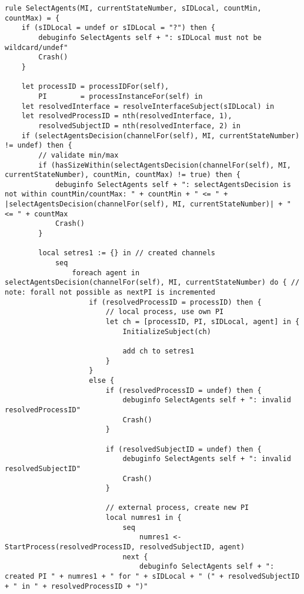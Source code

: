 \begin{listing}[H]
\begin{verbatim}
rule SelectAgents(MI, currentStateNumber, sIDLocal, countMin, countMax) = {
    if (sIDLocal = undef or sIDLocal = "?") then {
        debuginfo SelectAgents self + ": sIDLocal must not be wildcard/undef"
        Crash()
    }

    let processID = processIDFor(self),
        PI        = processInstanceFor(self) in
    let resolvedInterface = resolveInterfaceSubject(sIDLocal) in
    let resolvedProcessID = nth(resolvedInterface, 1),
        resolvedSubjectID = nth(resolvedInterface, 2) in
    if (selectAgentsDecision(channelFor(self), MI, currentStateNumber) != undef) then {
        // validate min/max
        if (hasSizeWithin(selectAgentsDecision(channelFor(self), MI, currentStateNumber), countMin, countMax) != true) then {
            debuginfo SelectAgents self + ": selectAgentsDecision is not within countMin/countMax: " + countMin + " <= " + |selectAgentsDecision(channelFor(self), MI, currentStateNumber)| + " <= " + countMax
            Crash()
        }

        local setres1 := {} in // created channels
            seq
                foreach agent in selectAgentsDecision(channelFor(self), MI, currentStateNumber) do { // note: forall not possible as nextPI is incremented
                    if (resolvedProcessID = processID) then {
                        // local process, use own PI
                        let ch = [processID, PI, sIDLocal, agent] in {
                            InitializeSubject(ch)

                            add ch to setres1
                        }
                    }
                    else {
                        if (resolvedProcessID = undef) then {
                            debuginfo SelectAgents self + ": invalid resolvedProcessID"
                            Crash()
                        }

                        if (resolvedSubjectID = undef) then {
                            debuginfo SelectAgents self + ": invalid resolvedSubjectID"
                            Crash()
                        }

                        // external process, create new PI
                        local numres1 in {
                            seq
                                numres1 <- StartProcess(resolvedProcessID, resolvedSubjectID, agent)
                            next {
                                debuginfo SelectAgents self + ": created PI " + numres1 + " for " + sIDLocal + " (" + resolvedSubjectID + " in " + resolvedProcessID + ")"


\end{verbatim}
\end{listing}
